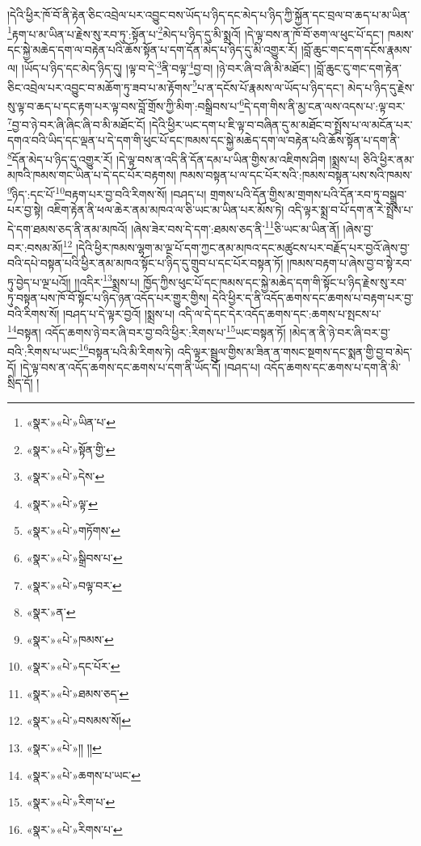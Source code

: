 །དེའི་ཕྱིར་ཁོ་བོ་ནི་རྟེན་ཅིང་འབྲེལ་པར་འབྱུང་བས་ཡོད་པ་ཉིད་དང་མེད་པ་ཉིད་ཀྱི་སྐྱོན་དང་བྲལ་བ་ཆད་པ་མ་ཡིན་\footnote{«སྣར་»«པེ་»ཡིན་པ་}རྟག་པ་མ་ཡིན་པ་རྗེས་སུ་རབ་ཏུ་:སྟོན་པ་\footnote{«སྣར་»«པེ་»སྟོན་གྱི་}མེད་པ་ཉིད་དུ་མི་སྨྲའོ། །དེ་ལྟ་བས་ན་ཁོ་བོ་ཅག་ལ་ཕུང་པོ་དང་། ཁམས་དང་སྐྱེ་མཆེད་དག་ལ་བརྟེན་པའི་ཆོས་སྟོན་པ་དག་དོན་མེད་པ་ཉིད་དུ་མི་འགྱུར་རོ། །བློ་ཆུང་གང་དག་དངོས་རྣམས་ལ། །ཡོད་པ་ཉིད་དང་མེད་ཉིད་དུ། །ལྟ་བ་དེ་\footnote{«སྣར་»«པེ་»དེས་}ནི་བལྟ་\footnote{«སྣར་»«པེ་»ལྟ་}བྱ་བ། །ཉེ་བར་ཞི་བ་ཞི་མི་མཐོང་། །བློ་ཆུང་ངུ་གང་དག་རྟེན་ཅིང་འབྲེལ་པར་འབྱུང་བ་མཆོག་ཏུ་ཟབ་པ་མ་རྟོགས་\footnote{«སྣར་»«པེ་»གཏོགས་}པ་ན་དངོས་པོ་རྣམས་ལ་ཡོད་པ་ཉིད་དང་། མེད་པ་ཉིད་དུ་རྗེས་སུ་ལྟ་བ་ཆད་པ་དང་རྟག་པར་ལྟ་བས་བློ་གྲོས་ཀྱི་མིག་:བསྒྲིབས་པ་\footnote{«སྣར་»«པེ་»སྒྲིབས་པ་}དེ་དག་གིས་ནི་མྱ་ངན་ལས་འདས་པ་:ལྟ་བར་\footnote{«སྣར་»«པེ་»བལྟ་བར་}བྱ་བ་ཉེ་བར་ཞི་ཞིང་ཞི་བ་མི་མཐོང་ངོ། །དེའི་ཕྱིར་ཡང་དག་པ་ཇི་ལྟ་བ་བཞིན་དུ་མ་མཐོང་བ་སྤྲོས་པ་ལ་མངོན་པར་དགའ་བའི་ཡིད་དང་ལྡན་པ་དེ་དག་གི་ཕུང་པོ་དང་ཁམས་དང་སྐྱེ་མཆེད་དག་ལ་བརྟེན་པའི་ཆོས་སྟོན་པ་དག་ནི་\footnote{«སྣར་»ན་}དོན་མེད་པ་ཉིད་དུ་འགྱུར་རོ། །དེ་ལྟ་བས་ན་འདི་ནི་དོན་དམ་པ་ཡིན་གྱིས་མ་འཇིགས་ཤིག །སྨྲས་པ། ཅིའི་ཕྱིར་ནམ་མཁའི་ཁམས་གང་ཡིན་པ་དེ་དང་པོར་བརྟགས། ཁམས་བསྟན་པ་ལ་དང་པོར་སའི་:ཁམས་བསྟན་པས་སའི་ཁམས་\footnote{«སྣར་»«པེ་»ཁམས་}ཉིད་:དང་པོ་\footnote{«སྣར་»«པེ་»དང་པོར་}བརྟག་པར་བྱ་བའི་རིགས་སོ། །བཤད་པ། གྲགས་པའི་དོན་གྱིས་མ་གྲགས་པའི་དོན་རབ་ཏུ་བསྒྲུབ་པར་བྱ་སྟེ། འཇིག་རྟེན་ནི་ཕལ་ཆེར་ནམ་མཁའ་ལ་ཅི་ཡང་མ་ཡིན་པར་མོས་ཏེ། འདི་ལྟར་སྨྲ་བ་པོ་དག་ན་རེ་སྤྲོས་པ་དེ་དག་ཐམས་ཅད་ནི་ནམ་མཁའོ། །ཞེས་ཟེར་བས་དེ་དག་:ཐམས་ཅད་ནི་\footnote{«སྣར་»«པེ་»ཐམས་ཅད་}ཅི་ཡང་མ་ཡིན་ནོ། །ཞེས་བྱ་བར་:བསམ་མོ།\footnote{«སྣར་»«པེ་»བསམས་སོ།} །དེའི་ཕྱིར་ཁམས་ལྷག་མ་ལྔ་པོ་དག་ཀྱང་ནམ་མཁའ་དང་མཚུངས་པར་བརྗོད་པར་བྱའོ་ཞེས་བྱ་བའི་དཔེ་བསྟན་པའི་ཕྱིར་ནམ་མཁའ་སྟོང་པ་ཉིད་དུ་གྲུབ་པ་དང་པོར་བསྟན་ཏོ། །ཁམས་བརྟག་པ་ཞེས་བྱ་བ་སྟེ་རབ་ཏུ་བྱེད་པ་ལྔ་པའོ།། །།འདིར་\footnote{«སྣར་»«པེ་»།། །།}སྨྲས་པ། ཁྱོད་ཀྱིས་ཕུང་པོ་དང་ཁམས་དང་སྐྱེ་མཆེད་དག་གི་སྟོང་པ་ཉིད་རྗེས་སུ་རབ་ཏུ་བསྟན་པས་ཁོ་བོ་སྟོང་པ་ཉིད་ཉན་འདོད་པར་གྱུར་གྱིས། དེའི་ཕྱིར་ད་ནི་འདོད་ཆགས་དང་ཆགས་པ་བརྟག་པར་བྱ་བའི་རིགས་སོ། །བཤད་པ་དེ་ལྟར་བྱའོ། །སྨྲས་པ། འདི་ལ་དེ་དང་དེར་འདོད་ཆགས་དང་:ཆགས་པ་སྤངས་པ་\footnote{«སྣར་»«པེ་»ཆགས་པ་ཡང་}བསྟན། འདོད་ཆགས་ཉེ་བར་ཞི་བར་བྱ་བའི་ཕྱིར་:རིགས་པ་\footnote{«སྣར་»«པེ་»རིག་པ་}ཡང་བསྟན་ཏོ། །མེད་ན་ནི་ཉེ་བར་ཞི་བར་བྱ་བའི་:རིགས་པ་ཡང་\footnote{«སྣར་»«པེ་»རིགས་པ་}བསྟན་པའི་མི་རིགས་ཏེ། འདི་ལྟར་སྦྲུལ་གྱིས་མ་ཟིན་ན་གསང་སྔགས་དང་སྨན་གྱི་བྱ་བ་མེད་དོ། །དེ་ལྟ་བས་ན་འདོད་ཆགས་དང་ཆགས་པ་དག་ནི་ཡོད་དོ། །བཤད་པ། འདོད་ཆགས་དང་ཆགས་པ་དག་ནི་མི་སྲིད་དོ། །
